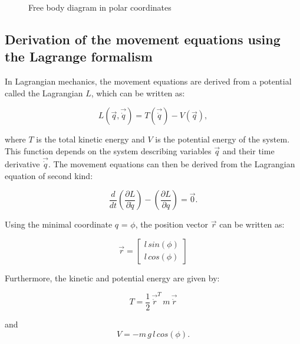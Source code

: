 \documentclass[12pt,bibstyle=none,pagenumberinfooter]{ifmdocument}
\begin{document}
\begin{figure}[h]
    \centering
    \def\svgwidth{0.4\textwidth}
    
    \caption{Free body diagram in polar coordinates}
    \label{fig:free body}
\end{figure}

\subsection{Derivation of the movement equations using the Lagrange formalism}
\label{sec: lagrange}

In Lagrangian mechanics, the movement equations are derived from a potential called the Lagrangian $L$, which can be written as:

\begin{equation}
\label{eq: Lagrangian}
    L(\Vec{q}, \Vec{\Dot{q}}) = T(\Vec{\Dot{q}}) - V(\Vec{q}),
\end{equation}

where $T$ is the total kinetic energy and $V$ is the potential energy of the system. This function depends on the system describing variables $\Vec{q}$ and their time derivative $\Vec{\Dot{q}}$. The movement equations can then be derived from the Lagrangian equation of second kind:

\begin{equation}
\label{eq: secondKindLagrangian}
    \frac{d}{dt}\left(\frac{\partial L}{\partial \Dot{q}}\right) - \left(\frac{\partial L}{\partial q}  \right) = \Vec{0}.
\end{equation}

Using the minimal coordinate $q$ = $\phi$, the position vector $\Vec{r}$ can be written as:

\begin{equation}
    \Vec{r} = \begin{bmatrix}
        l\,sin(\phi) \\ l\, cos(\phi) 
        \end{bmatrix}
\end{equation}

Furthermore, the kinetic and potential energy are given by:

\begin{equation}
    T = \frac{1}{2}\,\Vec{\Dot{r}}^T\,m\,\Vec{\Dot{r}}
\end{equation}

and 
\begin{equation}
    V = -m\,g\,l\,cos(\phi).
\end{equation}
\end{document}
